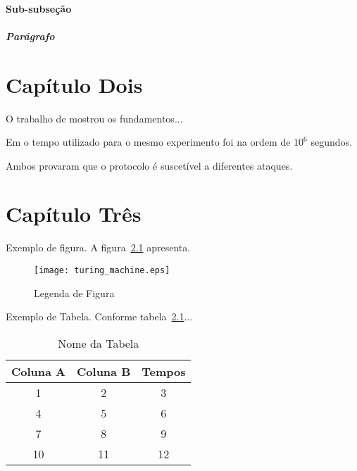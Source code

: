 \documentclass[tcc,ec]{texfurg} %
\begin{document}
\lipsum[2]

\subsubsection{Sub-subseção}

\lipsum[15]

\paragraph{Parágrafo}

\lipsum[17]


\chapter{Capítulo Dois}

O trabalho de \citet{knuth:84} mostrou os fundamentos...

\lipsum[3]

Em \citet{boulic:91} o tempo utilizado para o mesmo experimento foi na ordem de $10^6$ segundos.

\lipsum[6]

Ambos \citep{knuth:84, smith:99} provaram que o protocolo é suscetível a diferentes ataques.

\lipsum[7]


\chapter{Capítulo Três}

Exemplo de figura. A figura~\ref{nome_figura} apresenta.

    \begin{figure}[htbp]
        \centering \texttt{[image: turing\_machine.eps]}
        \caption{Legenda de Figura}
        \label{nome_figura}
    \end{figure}

Exemplo de Tabela. Conforme tabela~\ref{tabela}...

    \begin{table}[htbp]
        \begin{center}
            \caption{Nome da Tabela}
            \label{tabela}
            \begin{tabular}{ccc}
                \hline
                Coluna A & Coluna B & Tempos \\
                \hline
                1       & 2     & 3     \\
                4       & 5     & 6     \\
                7       & 8     & 9     \\
                10      & 11    & 12    \\
                \hline
            \end{tabular}
        \end{center}
    \end{table}
\end{document}
